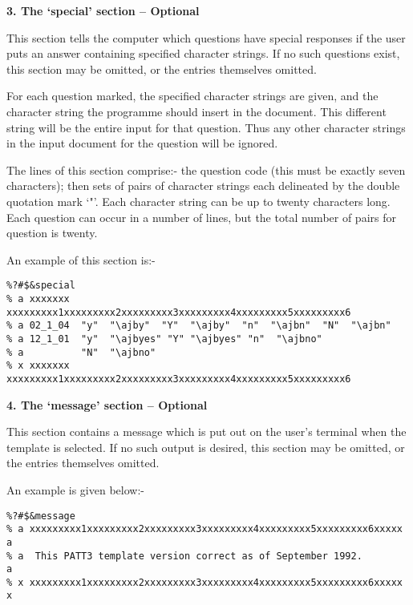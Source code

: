 \vspace*{0.2cm}
{\bf \large 3. The `special' section -- Optional}
\vspace*{0.2cm}

This section tells the computer which questions have special responses if
the user puts an answer containing specified character strings. If no such
questions exist, this section may be omitted, or the entries themselves
omitted.

For each question marked, the specified character strings are given, and
the character string the programme should insert in the document. This
different string will be the entire input for that question. Thus any other
character strings in the input document for the question will be ignored.

The lines of this section comprise:- the question code (this must be
exactly seven characters); then sets of  pairs of character strings each
delineated by the double quotation mark `"'. Each character string can be
up to twenty characters long. Each question can occur in a number of lines,
but the total number of pairs for question is twenty.

An example of this section is:-

\begin{verbatim}
%?#$&special
% a xxxxxxx xxxxxxxxx1xxxxxxxxx2xxxxxxxxx3xxxxxxxxx4xxxxxxxxx5xxxxxxxxx6
% a 02_1_04  "y"  "\ajby"  "Y"  "\ajby"  "n"  "\ajbn"  "N"  "\ajbn"
% a 12_1_01  "y"  "\ajbyes" "Y" "\ajbyes" "n"  "\ajbno"
% a          "N"  "\ajbno"
% x xxxxxxx xxxxxxxxx1xxxxxxxxx2xxxxxxxxx3xxxxxxxxx4xxxxxxxxx5xxxxxxxxx6
\end{verbatim}

\vspace*{0.2cm}
{\bf \large 4. The `message' section -- Optional}
\vspace*{0.2cm}

This section contains a message which is put out on the user's terminal
when the template is selected. If no such output is desired, this section
may be omitted, or the entries themselves omitted.

An example is given below:-

\begin{verbatim}
%?#$&message
% a xxxxxxxxx1xxxxxxxxx2xxxxxxxxx3xxxxxxxxx4xxxxxxxxx5xxxxxxxxx6xxxxx a
% a  This PATT3 template version correct as of September 1992.        a
% x xxxxxxxxx1xxxxxxxxx2xxxxxxxxx3xxxxxxxxx4xxxxxxxxx5xxxxxxxxx6xxxxx x
\end{verbatim}

